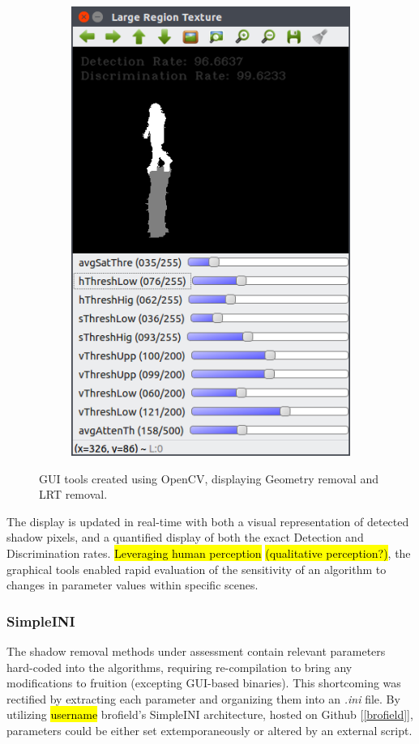 \documentclass[12pt]{report}
\begin{document}
\begin{figure}
\begin{subfigure}{.49\linewidth}
  \includegraphics[width=.7\linewidth]{figures/lr_caviar_default.png}
  \label{fig:sub2}
\end{subfigure}
\caption{GUI tools created using OpenCV, displaying Geometry removal and LRT removal.}
\label{fig:guitools}
\end{figure}

The display is updated in real-time with both a visual representation of detected shadow pixels, and a quantified display of both the exact Detection and Discrimination rates. \hl{Leveraging human perception} \hl{(qualitative perception?)}, the graphical tools enabled rapid evaluation of the sensitivity of an algorithm to changes in parameter values within specific scenes. 

\subsubsection{SimpleINI}
The shadow removal methods under assessment contain relevant parameters hard-coded into the algorithms, requiring re-compilation to bring any modifications to fruition (excepting GUI-based binaries). This shortcoming was rectified by extracting each parameter and organizing them into an \textit{.ini} file. By utilizing \hl{username} brofield's SimpleINI architecture, hosted on Github [\ref{brofield}], parameters could be either set extemporaneously or altered by an external script. 
\end{document}

